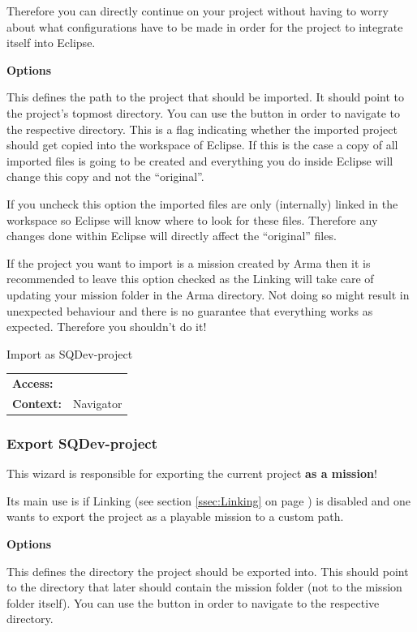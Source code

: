 \documentclass[twoside=false]{scrbook}
\newcommand{\SQDev}{SQDev\xspace}
\newcommand{\eclipse}{Eclipse\xspace}
\newcommand{\arma}{Arma\xspace}
\newenvironment{options*}{%
	\vspace{3mm}%
	\hrule{}

	\newcommand{\option}[1]{%
		\item \textbf{##1} - \hspace{-1.6mm}%
	}%
	\begin{itemize}%
}{%
	\end{itemize}\hrule%
	\vspace{3mm}%
}
\newenvironment{options}[1][Options]{%
	\needspace{2\baselineskip}
	\textbf{#1}%
	\begin{options*}%
}{%
	\end{options*}%
}
\begin{document}
	Therefore you can directly continue on your project without having to worry about what configurations have to be made in order for the project to integrate itself into \eclipse.
	
	\begin{options}
		 This defines the path to the project that should be imported. It should point to the project's topmost directory. You can use the  button in order to navigate to the respective directory.
		 This is a flag indicating whether the imported project should get copied into the workspace of \eclipse. If this is the case a copy of all imported files is going to be created and everything you do inside \eclipse will change this copy and not the “original”.
		
		If you uncheck this option the imported files are only (internally) linked in the workspace so \eclipse will know where to look for these files. Therefore any changes done within \eclipse will directly affect the “original” files.
		
		If the project you want to import is a mission created by \arma then it is recommended to leave this option checked as the Linking will take care of updating your mission folder in the \arma directory. Not doing so might result in unexpected behaviour and there is no guarantee that everything works as expected. Therefore you shouldn't do it!
	\end{options}
	
	\begin{info}{Import as \SQDev-project}
		\begin{tabular}{l l}
			\centering
			\textbf{Access:} & \menu{Import... > Import as SQDevProject}\\
			\textbf{Context:} & Navigator
		\end{tabular}
	\end{info}
	
	
	\subsubsection{Export \SQDev-project}
	This wizard is responsible for exporting the current project \textbf{as a mission}!
	
	Its main use is if Linking (see section \ref{ssec:Linking} on page \pageref{ssec:Linking}) is disabled and one wants to export the project as a playable mission to a custom path.
	
	\begin{options}
		 This defines the directory the project should be exported into. This should point to the directory that later should contain the mission folder (not to the mission folder itself). You can use the  button in order to navigate to the respective directory.
	\end{options}
	
\end{document}
